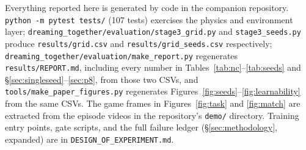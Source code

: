 \documentclass[11pt]{article}
\begin{document}
Everything reported here is generated by code in the companion
repository. \texttt{python -m pytest tests/} (107 tests) exercises the
physics and environment layer;
\texttt{dreaming\_together/evaluation/stage3\_grid.py} and
\texttt{stage3\_seeds.py} produce \texttt{results/grid.csv} and
\texttt{results/grid\_seeds.csv} respectively;
\texttt{dreaming\_together/evaluation/make\_report.py} regenerates
\texttt{results/REPORT.md}, including every number in
Tables~\ref{tab:nc}--\ref{tab:seeds} and
\S\ref{sec:singleseed}--\ref{sec:p8}, from those two CSVs, and
\texttt{tools/make\_paper\_figures.py} regenerates
Figures~\ref{fig:seeds}--\ref{fig:learnability} from the same CSVs.
The game frames in Figures~\ref{fig:task} and \ref{fig:match} are
extracted from the episode videos in the repository's \texttt{demo/}
directory. Training entry points, gate scripts, and the full failure
ledger (\S\ref{sec:methodology}, expanded) are in
\texttt{DESIGN\_OF\_EXPERIMENT.md}.
\end{document}
